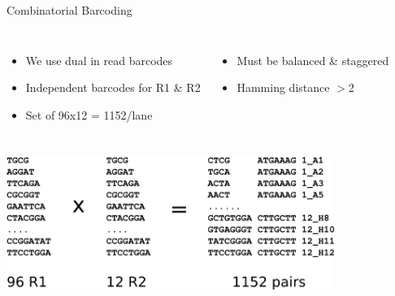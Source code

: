\documentclass{beamer}
\begin{document}
\begin{frame}{Combinatorial Barcoding}
  \begin{columns}[t]
    \begin{itemize}
      \item We use dual in read barcodes
      \item Independent barcodes for R1 \& R2
      \item Set of 96x12 = 1152/lane
    \end{itemize}
    \begin{itemize}
      \item Must be balanced \& staggered
      \item Hamming distance $>$2
    \end{itemize}
  \end{columns}
  \begin{center}
    \includegraphics[width=0.8\textwidth]{img/combBcd.png}
  \end{center}
\end{frame}
\end{document}
